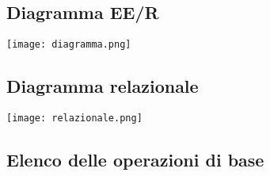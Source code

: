 \documentclass{article}
\begin{document}
    \subsection{Diagramma EE/R}
    \begin{center}
        \texttt{[image: diagramma.png]}
    \end{center} 
    
\newpage
    \subsection{Diagramma relazionale}
    \begin{center}
        \texttt{[image: relazionale.png]}
    \end{center} 

\subsection{Elenco delle operazioni di base}
\end{document}
